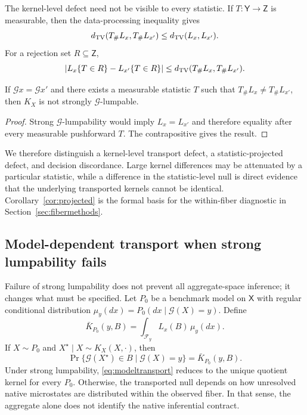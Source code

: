 The kernel-level defect need not be visible to every statistic. If $T:\mathsf Y\to\mathsf Z$ is measurable, then the data-processing inequality gives
\begin{equation}
d_{\mathrm{TV}}(T_\#L_x,T_\#L_{x'})\le d_{\mathrm{TV}}(L_x,L_{x'}).
\label{eq:dataprocessing}
\end{equation}
For a rejection set $R\subseteq\mathsf Z$,
\begin{equation}
\left|L_x\{T\in R\}-L_{x'}\{T\in R\}\right|
\le d_{\mathrm{TV}}(T_\#L_x,T_\#L_{x'}).
\label{eq:decisionbound}
\end{equation}

\begin{corollary}\label{cor:projected}
If $\mathcal Gx=\mathcal Gx'$ and there exists a measurable statistic $T$ such that $T_\#L_x\neq T_\#L_{x'}$, then $K_X$ is not strongly $\mathcal G$-lumpable.
\end{corollary}

\begin{proof}
Strong $\mathcal G$-lumpability would imply $L_x=L_{x'}$ and therefore equality after every measurable pushforward $T$. The contrapositive gives the result.
\end{proof}

We therefore distinguish a kernel-level transport defect, a statistic-projected defect, and decision discordance. Large kernel differences may be attenuated by a particular statistic, while a difference in the statistic-level null is direct evidence that the underlying transported kernels cannot be identical. Corollary~\ref{cor:projected} is the formal basis for the within-fiber diagnostic in Section~\ref{sec:fibermethods}.

\subsection{Model-dependent transport when strong lumpability fails}\label{sec:modeltransport}

Failure of strong lumpability does not prevent all aggregate-space inference; it changes what must be specified. Let $P_0$ be a benchmark model on $\mathsf X$ with regular conditional distribution $\mu_y(dx)=P_0(dx\mid\mathcal G(X)=y)$. Define
\begin{equation}
\bar K_{P_0}(y,B)=\int_{\mathcal F_y}L_x(B)\,\mu_y(dx).
\label{eq:modeltransport}
\end{equation}
If $X\sim P_0$ and $X^\star\mid X\sim K_X(X,\cdot)$, then
\begin{equation}
\Pr\{\mathcal G(X^\star)\in B\mid\mathcal G(X)=y\}=\bar K_{P_0}(y,B).
\label{eq:conditionaltransport}
\end{equation}
Under strong lumpability, \eqref{eq:modeltransport} reduces to the unique quotient kernel for every $P_0$. Otherwise, the transported null depends on how unresolved native microstates are distributed within the observed fiber. In that sense, the aggregate alone does not identify the native inferential contract.

